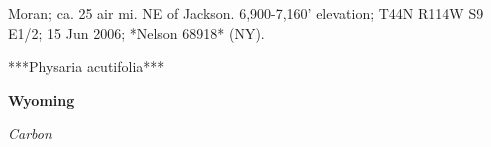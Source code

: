 Moran; ca. 25 air mi. NE of Jackson. 6,900-7,160' elevation; T44N R114W S9 E1/2; 15 Jun 2006; *Nelson 68918* (NY).  



***Physaria acutifolia***

\textbf{Wyoming} %

\textit{Carbon}




